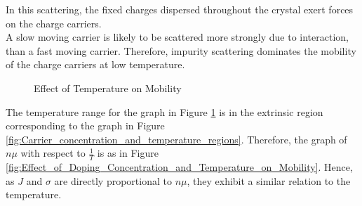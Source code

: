 \documentclass[titlepage, fleqn, a4paper, 12pt, twoside]{article}
\theoremstyle{definition}
\theoremstyle{theorem}
\begin{document}
In this scattering, the fixed charges dispersed throughout the crystal exert forces on the charge carriers.\\
A slow moving carrier is likely to be scattered more strongly due to interaction, than a fast moving carrier.
Therefore, impurity scattering dominates the mobility of the charge carriers at low temperature.

\begin{figure}[h]
	\centering
	\caption{Effect of Temperature on Mobility}
	\label{fig:Effect_of_Temperature_on_Mobility}
\end{figure}

The temperature range for the graph in Figure \ref{fig:Effect_of_Temperature_on_Mobility} is in the extrinsic region corresponding to the graph in Figure \ref{fig:Carrier_concentration_and_temperature_regions}.
Therefore, the graph of $n \mu$ with respect to $\frac{1}{T}$ is as in Figure \ref{fig:Effect_of_Doping_Concentration_and_Temperature_on_Mobility}.
Hence, as $J$ and $\sigma$ are directly proportional to $n \mu$, they exhibit a similar relation to the temperature.
\end{document}
